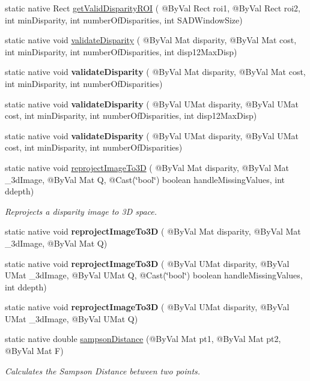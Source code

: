 \begin{DoxyCompactItemize}
\item 
static native Rect \hyperlink{group__calib3d_ga9ebc646662642a921e82a8eb83151c7b}{get\+Valid\+Disparity\+R\+OI} ( @By\+Val Rect roi1, @By\+Val Rect roi2, int min\+Disparity, int number\+Of\+Disparities, int S\+A\+D\+Window\+Size)
\item 
static native void \hyperlink{group__calib3d_ga15aa38f118664fcfaccd489f47e33f0d}{validate\+Disparity} ( @By\+Val Mat disparity, @By\+Val Mat cost, int min\+Disparity, int number\+Of\+Disparities, int disp12\+Max\+Disp)
\item 
static native void {\bfseries validate\+Disparity} ( @By\+Val Mat disparity, @By\+Val Mat cost, int min\+Disparity, int number\+Of\+Disparities)
\item 
static native void {\bfseries validate\+Disparity} ( @By\+Val U\+Mat disparity, @By\+Val U\+Mat cost, int min\+Disparity, int number\+Of\+Disparities, int disp12\+Max\+Disp)
\item 
static native void {\bfseries validate\+Disparity} ( @By\+Val U\+Mat disparity, @By\+Val U\+Mat cost, int min\+Disparity, int number\+Of\+Disparities)
\item 
static native void \hyperlink{group__calib3d_ga523a57d6b7e1229eed6a1c88b22d0408}{reproject\+Image\+To3D} ( @By\+Val Mat disparity, @By\+Val Mat \+\_\+3d\+Image, @By\+Val Mat Q, @Cast(\char`\"{}bool\char`\"{}) boolean handle\+Missing\+Values, int ddepth)
\begin{DoxyCompactList}\small\item\em Reprojects a disparity image to 3D space. \end{DoxyCompactList}\item 
static native void {\bfseries reproject\+Image\+To3D} ( @By\+Val Mat disparity, @By\+Val Mat \+\_\+3d\+Image, @By\+Val Mat Q)
\item 
static native void {\bfseries reproject\+Image\+To3D} ( @By\+Val U\+Mat disparity, @By\+Val U\+Mat \+\_\+3d\+Image, @By\+Val U\+Mat Q, @Cast(\char`\"{}bool\char`\"{}) boolean handle\+Missing\+Values, int ddepth)
\item 
static native void {\bfseries reproject\+Image\+To3D} ( @By\+Val U\+Mat disparity, @By\+Val U\+Mat \+\_\+3d\+Image, @By\+Val U\+Mat Q)
\item 
static native double \hyperlink{group__calib3d_ga708b24ef9e230b1b82f146fb3e7b2377}{sampson\+Distance} (@By\+Val Mat pt1, @By\+Val Mat pt2, @By\+Val Mat F)
\begin{DoxyCompactList}\small\item\em Calculates the Sampson Distance between two points. \end{DoxyCompactList}\item 

\end{DoxyCompactItemize}
